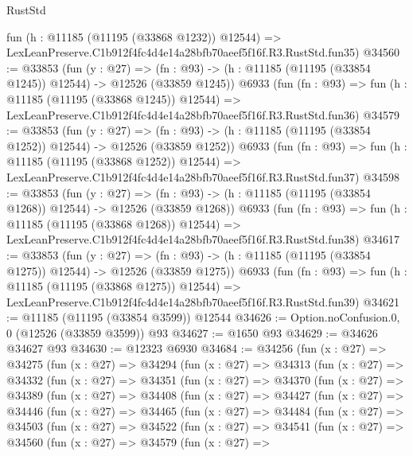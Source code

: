 \begin{lexlean}{RustStd}
\begin{coremodule}
    fun (h : @11185 (@11195 (@33868 @1232)) @12544) =>
    LexLeanPreserve.C1b912f4fc4d4e14a28bfb70aeef5f16f.R3.RustStd.fun35)
@34560 := @33853
    (fun (y : @27) =>
    (fn : @93) -> (h : @11185 (@11195 (@33854 @1245)) @12544) -> @12526 (@33859 @1245))
    @6933
    (fun (fn : @93) =>
    fun (h : @11185 (@11195 (@33868 @1245)) @12544) =>
    LexLeanPreserve.C1b912f4fc4d4e14a28bfb70aeef5f16f.R3.RustStd.fun36)
@34579 := @33853
    (fun (y : @27) =>
    (fn : @93) -> (h : @11185 (@11195 (@33854 @1252)) @12544) -> @12526 (@33859 @1252))
    @6933
    (fun (fn : @93) =>
    fun (h : @11185 (@11195 (@33868 @1252)) @12544) =>
    LexLeanPreserve.C1b912f4fc4d4e14a28bfb70aeef5f16f.R3.RustStd.fun37)
@34598 := @33853
    (fun (y : @27) =>
    (fn : @93) -> (h : @11185 (@11195 (@33854 @1268)) @12544) -> @12526 (@33859 @1268))
    @6933
    (fun (fn : @93) =>
    fun (h : @11185 (@11195 (@33868 @1268)) @12544) =>
    LexLeanPreserve.C1b912f4fc4d4e14a28bfb70aeef5f16f.R3.RustStd.fun38)
@34617 := @33853
    (fun (y : @27) =>
    (fn : @93) -> (h : @11185 (@11195 (@33854 @1275)) @12544) -> @12526 (@33859 @1275))
    @6933
    (fun (fn : @93) =>
    fun (h : @11185 (@11195 (@33868 @1275)) @12544) =>
    LexLeanPreserve.C1b912f4fc4d4e14a28bfb70aeef5f16f.R3.RustStd.fun39)
@34621 := @11185 (@11195 (@33854 @3599)) @12544
@34626 := Option.noConfusion.{0, 0} (@12526 (@33859 @3599)) @93
@34627 := @1650 @93
@34629 := @34626 @34627 @93
@34630 := @12323 @6930
@34684 := @34256
    (fun (x : @27) =>
    @34275
      (fun (x : @27) =>
      @34294
        (fun (x : @27) =>
        @34313
          (fun (x : @27) =>
          @34332
            (fun (x : @27) =>
            @34351
              (fun (x : @27) =>
              @34370
                (fun (x : @27) =>
                @34389
                  (fun (x : @27) =>
                  @34408
                    (fun (x : @27) =>
                    @34427
                      (fun (x : @27) =>
                      @34446
                        (fun (x : @27) =>
                        @34465
                          (fun (x : @27) =>
                          @34484
                            (fun (x : @27) =>
                            @34503
                              (fun (x : @27) =>
                              @34522
                                (fun (x : @27) =>
                                @34541
                                  (fun (x : @27) =>
                                  @34560
                                    (fun (x : @27) =>
                                    @34579
                                      (fun (x : @27) =>

\end{coremodule}
\end{lexlean}
